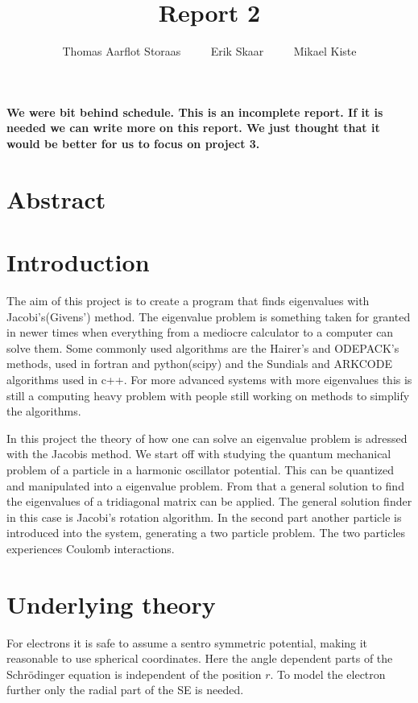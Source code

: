 

\author{Thomas Aarflot Storaas    $\qquad$    Erik Skaar  $\qquad$    Mikael Kiste}
\title{Report 2}
\maketitle


\textbf{We were bit behind schedule. This is an incomplete report. If it is needed we can write more on this report. We just thought that it would be better for us to focus on project 3.}

\section{Abstract}


\section{Introduction}
The aim of this project is to create a program that finds eigenvalues with Jacobi's(Givens') method. The eigenvalue problem is something taken for granted in newer times when everything from a mediocre calculator to a computer can solve them. Some commonly used algorithms are the Hairer's and ODEPACK's methods, used in fortran and python(scipy) and the Sundials and ARKCODE algorithms used in c++. For more advanced systems with more eigenvalues this is still a computing heavy problem with people still working on methods to simplify the algorithms.

In this project the theory of how one can solve an eigenvalue problem is adressed with the Jacobis method. We start off with studying the quantum mechanical problem of a particle in a harmonic oscillator potential.
This can be quantized and manipulated into a eigenvalue problem. From that a general solution to find the eigenvalues of a tridiagonal matrix can be applied. The general solution finder in this case is Jacobi's rotation algorithm. In the second part another particle is introduced into the system, generating a two particle problem. The two particles experiences Coulomb interactions.

\section{Underlying theory}

For electrons it is safe to assume a sentro symmetric potential, making it reasonable to use spherical coordinates. Here the angle dependent parts of the Schrödinger equation is independent of the position $r$. To model the electron further only the radial part of the SE is needed.

